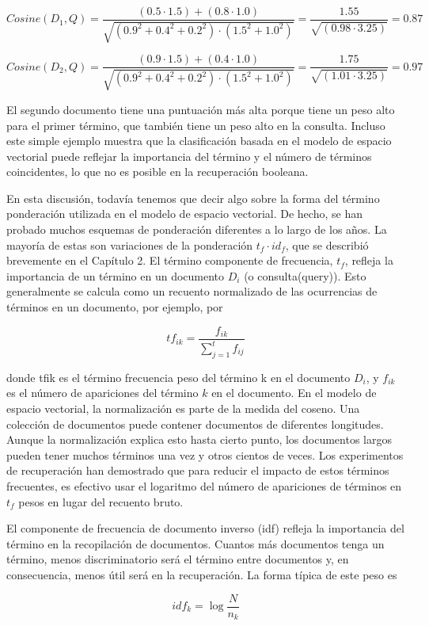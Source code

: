 $$Cosine(D_1,Q)=\frac{(0.5 \cdot 1.5) + (0.8 \cdot 1.0) }{\sqrt{(0.9^2+0.4^2+0.2^2) \cdot (1.5^2+1.0^2)}}=\frac{1.55}{\sqrt{(0.98 \cdot 3.25)}}=0.87$$

$$Cosine(D_2,Q)=\frac{(0.9 \cdot 1.5) + (0.4 \cdot 1.0) }{\sqrt{(0.9^2+0.4^2+0.2^2) \cdot (1.5^2+1.0^2)}}=\frac{1.75}{\sqrt{(1.01 \cdot 3.25)}}=0.97$$


El segundo documento tiene una puntuación más alta porque tiene un peso alto para el primer término, que también tiene un peso alto en la consulta. Incluso este simple ejemplo muestra que la clasificación basada en el modelo de espacio vectorial puede reflejar la importancia del término y el número de términos coincidentes, lo que no es posible en la recuperación booleana.

En esta discusión, todavía tenemos que decir algo sobre la forma del término ponderación utilizada en el modelo de espacio vectorial. De hecho, se han probado muchos esquemas de ponderación diferentes a lo largo de los años. La mayoría de estas son variaciones de la ponderación $t_f \cdot id_f$, que se describió brevemente en el Capítulo 2. El término componente de frecuencia, $t_f$, refleja la importancia de un término en un documento $D_i$ (o consulta(query)). Esto generalmente se calcula como un recuento normalizado de las ocurrencias de términos en un documento, por ejemplo, por

$$tf_{ik}=\frac{f_{ik}}{\sum_{j=1}^{t}f_{ij}}$$

donde tfik es el término frecuencia peso del término k en el documento $D_i$, y $f_{ik}$ es el número de apariciones del término $k$ en el documento. En el modelo de espacio vectorial, la normalización es parte de la medida del coseno. Una colección de documentos puede contener documentos de diferentes longitudes. Aunque la normalización explica esto hasta cierto punto, los documentos largos pueden tener muchos términos una vez y otros cientos de veces. Los experimentos de recuperación han demostrado que para reducir el impacto de estos términos frecuentes, es efectivo usar el logaritmo del número de apariciones de términos en $t_f$ pesos en lugar del recuento bruto.

El componente de frecuencia de documento inverso (idf) refleja la importancia del término en la recopilación de documentos. Cuantos más documentos tenga un término, menos discriminatorio será el término entre documentos y, en consecuencia, menos útil será en la recuperación. La forma típica de este peso es

$$idf_k = \log\frac{N}{n_k}$$


